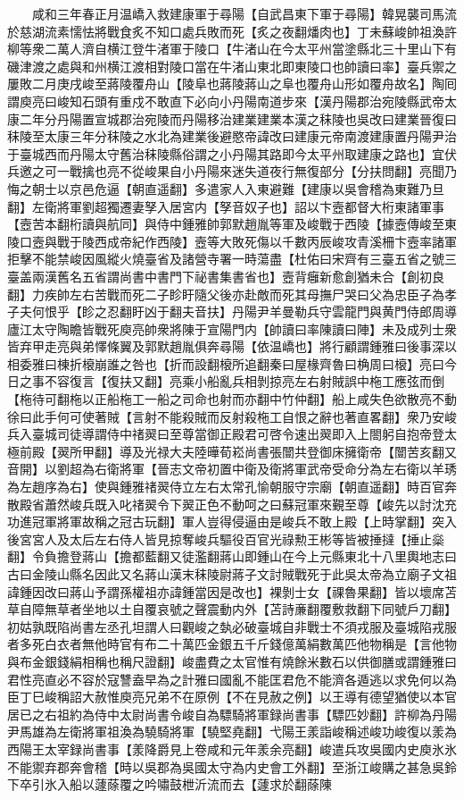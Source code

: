 　　咸和三年春正月温嶠入救建康軍于尋陽【自武昌東下軍于尋陽】韓晃襲司馬流於慈湖流素懦怯將戰食炙不知口處兵敗而死【炙之夜翻燔肉也】丁未蘇峻帥祖渙許柳等衆二萬人濟自横江登牛渚軍于陵口【牛渚山在今太平州當塗縣北三十里山下有磯津渡之處與和州横江渡相對陵口當在牛渚山東北即東陵口也帥讀曰率】臺兵禦之屢敗二月庚戌峻至蔣陵覆舟山【陵阜也蔣陵蔣山之阜也覆舟山形如覆舟故名】陶囘謂庾亮曰峻知石頭有重戍不敢直下必向小丹陽南道步來【漢丹陽郡治宛陵縣武帝太康二年分丹陽置宣城郡治宛陵而丹陽移治建業建業本漢之秣陵也吳改曰建業晉復曰秣陵至太康三年分秣陵之水北為建業後避愍帝諱改曰建康元帝南渡建康置丹陽尹治于臺城西而丹陽太守舊治秣陵縣俗謂之小丹陽其路即今太平州取建康之路也】宜伏兵邀之可一戰擒也亮不從峻果自小丹陽來迷失道夜行無復部分【分扶問翻】亮聞乃悔之朝士以京邑危逼【朝直遥翻】多遣家人入東避難【建康以吳會稽為東難乃旦翻】左衛將軍劉超獨遷妻孥入居宮内【孥音奴子也】詔以卞壼都督大桁東諸軍事【壼苦本翻桁讀與航同】與侍中鍾雅帥郭默趙胤等軍及峻戰于西陵【據壼傳峻至東陵口壼與戰于陵西成帝紀作西陵】壼等大敗死傷以千數丙辰峻攻青溪柵卞壼率諸軍拒擊不能禁峻因風縱火燒臺省及諸營寺署一時蕩盡【杜佑曰宋齊有三臺五省之號三臺盖兩漢舊名五省謂尚書中書門下祕書集書省也】壼背癰新愈創猶未合【創初良翻】力疾帥左右苦戰而死二子眕盱隨父後亦赴敵而死其母撫尸哭曰父為忠臣子為孝子夫何恨乎【眕之忍翻盱凶于翻夫音扶】丹陽尹羊曼勒兵守雲龍門與黄門侍郎周導廬江太守陶瞻皆戰死庾亮帥衆將陳于宣陽門内【帥讀曰率陳讀曰陣】未及成列士衆皆弃甲走亮與弟懌條翼及郭默趙胤俱奔尋陽【依温嶠也】將行顧謂鍾雅曰後事深以相委雅曰棟折榱崩誰之咎也【折而設翻榱所追翻秦曰屋椽齊魯曰桷周曰榱】亮曰今日之事不容復言【復扶又翻】亮乘小船亂兵相剝掠亮左右射賊誤中柂工應弦而倒【柂待可翻柂以正船柂工一船之司命也射而亦翻中竹仲翻】船上咸失色欲散亮不動徐曰此手何可使著賊【言射不能殺賊而反射殺柂工自恨之辭也著直畧翻】衆乃安峻兵入臺城司徒導謂侍中禇翜曰至尊當御正殿君可啓令速出翜即入上閤躬自抱帝登太極前殿【翜所甲翻】導及光禄大夫陸曄荀崧尚書張闓共登御床擁衛帝【闓苦亥翻又音開】以劉超為右衛將軍【晉志文帝初置中衛及衛將軍武帝受命分為左右衛以羊琇為左趙序為右】使與鍾雅禇翜侍立左右太常孔愉朝服守宗廟【朝直遥翻】時百官奔散殿省蕭然峻兵既入叱禇翜令下翜正色不動呵之曰蘇冠軍來覲至尊【峻先以討沈充功進冠軍將軍故稱之冠古玩翻】軍人豈得侵逼由是峻兵不敢上殿【上時掌翻】突入後宮宮人及太后左右侍人皆見掠奪峻兵驅役百官光祿勲王彬等皆被捶撻【捶止橤翻】令負擔登蔣山【擔都藍翻又徒濫翻蔣山即鍾山在今上元縣東北十八里輿地志曰古曰金陵山縣名因此又名蔣山漢末秣陵尉蔣子文討賊戰死于此吳太帝為立廟子文祖諱鍾因改曰蔣山予謂孫權祖亦諱鍾當因是改也】裸剝士女【祼魯果翻】皆以壞席苫草自障無草者坐地以土自覆哀號之聲震動内外【苫詩亷翻覆敷救翻下同號戶刀翻】初姑孰既陷尚書左丞孔坦謂人曰觀峻之埶必破臺城自非戰士不須戎服及臺城陷戎服者多死白衣者無他時官有布二十萬匹金銀五千斤錢億萬絹數萬匹他物稱是【言他物與布金銀錢絹相稱也稱尺證翻】峻盡費之太官惟有燒餘米數石以供御膳或謂鍾雅曰君性亮直必不容於寇讐盍早為之計雅曰國亂不能匡君危不能濟各遁逃以求免何以為臣丁巳峻稱詔大赦惟庾亮兄弟不在原例【不在見赦之例】以王導有德望猶使以本官居已之右祖約為侍中太尉尚書令峻自為驃騎將軍録尚書事【驃匹妙翻】許柳為丹陽尹馬雄為左衛將軍祖渙為驍騎將軍【驍堅堯翻】弋陽王羕詣峻稱述峻功峻復以羕為西陽王太宰録尚書事【羕降爵見上卷咸和元年羕余亮翻】峻遣兵攻吳國内史庾氷氷不能禦弃郡奔會稽【時以吳郡為吳國太守為内史會工外翻】至浙江峻購之甚急吳鈴下卒引氷入船以蘧蒢覆之吟嘯鼓枻沂流而去【蘧求於翻蒢陳
